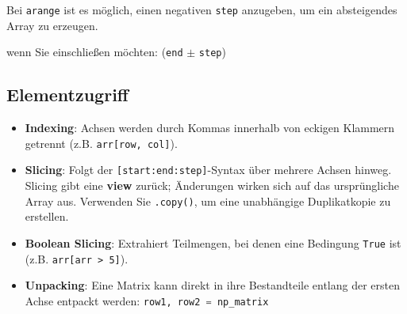 \medbreak

Bei \texttt{arange} ist es möglich, einen negativen \texttt{step} anzugeben, um ein absteigendes Array zu erzeugen.

 wenn Sie einschließen möchten: (\texttt{end} $\pm$ \texttt{step})

\columnbreak

\subsection{Elementzugriff}
\begin{itemize}
    \item \textbf{Indexing}: Achsen werden durch Kommas innerhalb von eckigen Klammern getrennt (z.B. \texttt{arr[row, col]}).
    \item \textbf{Slicing}: Folgt der \texttt{[start:end:step]}-Syntax über mehrere
     Achsen hinweg. Slicing gibt eine \textbf{view} zurück; Änderungen wirken sich auf das ursprüngliche Array aus. 
     Verwenden Sie \texttt{.copy()}, um eine unabhängige Duplikatkopie zu erstellen.
    \item \textbf{Boolean Slicing}: Extrahiert Teilmengen, bei denen eine Bedingung \texttt{True} ist (z.B. \texttt{arr[arr > 5]}).
    \item \textbf{Unpacking}: Eine Matrix kann direkt in ihre Bestandteile entlang 
    der ersten Achse entpackt werden: \lstinline[language=Python]|row1, row2 = np_matrix|
\end{itemize}

